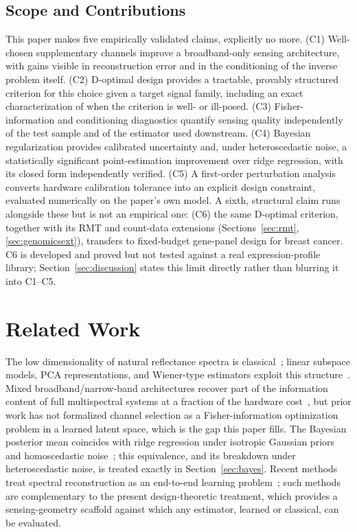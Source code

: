 \documentclass[11pt]{article}
\begin{document}
\subsection{Scope and Contributions}
\label{sec:scope}

This paper makes five empirically validated claims, explicitly no more. (C1) Well-chosen supplementary channels improve a broadband-only sensing architecture, with gains visible in reconstruction error and in the conditioning of the inverse problem itself. (C2) D-optimal design provides a tractable, provably structured criterion for this choice given a target signal family, including an exact characterization of when the criterion is well- or ill-posed. (C3) Fisher-information and conditioning diagnostics quantify sensing quality independently of the test sample and of the estimator used downstream. (C4) Bayesian regularization provides calibrated uncertainty and, under heteroscedastic noise, a statistically significant point-estimation improvement over ridge regression, with its closed form independently verified. (C5) A first-order perturbation analysis converts hardware calibration tolerance into an explicit design constraint, evaluated numerically on the paper's own model. A sixth, structural claim runs alongside these but is not an empirical one: (C6) the same D-optimal criterion, together with its RMT and count-data extensions (Sections~\ref{sec:rmt}, \ref{sec:genomicsext}), transfers to fixed-budget gene-panel design for breast cancer. C6 is developed and proved but not tested against a real expression-profile library; Section~\ref{sec:discussion} states this limit directly rather than blurring it into C1--C5.

\section{Related Work}

The low dimensionality of natural reflectance spectra is classical~\citep{ref1}; linear subspace models, PCA representations, and Wiener-type estimators exploit this structure~\citep{ref6,ref7}. Mixed broadband/narrow-band architectures recover part of the information content of full multispectral systems at a fraction of the hardware cost~\citep{ref2,ref8}, but prior work has not formalized channel selection as a Fisher-information optimization problem in a learned latent space, which is the gap this paper fills. The Bayesian posterior mean coincides with ridge regression under isotropic Gaussian priors and homoscedastic noise~\citep{ref4}; this equivalence, and its breakdown under heteroscedastic noise, is treated exactly in Section~\ref{sec:bayes}. Recent methods treat spectral reconstruction as an end-to-end learning problem~\citep{ref9,ref10}; such methods are complementary to the present design-theoretic treatment, which provides a sensing-geometry scaffold against which any estimator, learned or classical, can be evaluated.
\end{document}
